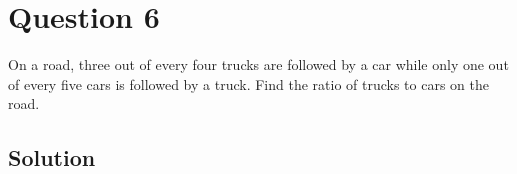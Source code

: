 \section*{Question 6}

On a road, three out of every four trucks are followed by a car while only one out of every five cars is followed by a truck.
Find the ratio of trucks to cars on the road.

\subsection*{Solution}
